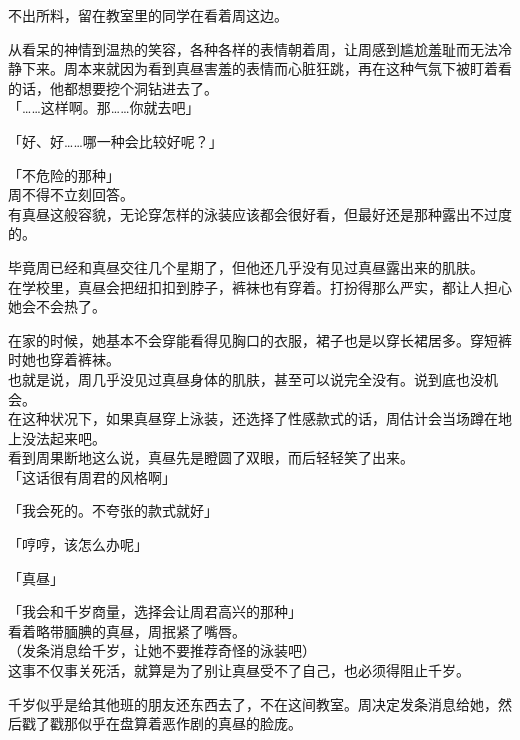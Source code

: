 不出所料，留在教室里的同学在看着周这边。

从看呆的神情到温热的笑容，各种各样的表情朝着周，让周感到尴尬羞耻而无法冷静下来。周本来就因为看到真昼害羞的表情而心脏狂跳，再在这种气氛下被盯着看的话，他都想要挖个洞钻进去了。\\

「……这样啊。那……你就去吧」

「好、好……哪一种会比较好呢？」

「不危险的那种」\\

周不得不立刻回答。\\

有真昼这般容貌，无论穿怎样的泳装应该都会很好看，但最好还是那种露出不过度的。

毕竟周已经和真昼交往几个星期了，但他还几乎没有见过真昼露出来的肌肤。\\

在学校里，真昼会把纽扣扣到脖子，裤袜也有穿着。打扮得那么严实，都让人担心她会不会热了。

在家的时候，她基本不会穿能看得见胸口的衣服，裙子也是以穿长裙居多。穿短裤时她也穿着裤袜。\\

也就是说，周几乎没见过真昼身体的肌肤，甚至可以说完全没有。说到底也没机会。\\

在这种状况下，如果真昼穿上泳装，还选择了性感款式的话，周估计会当场蹲在地上没法起来吧。\\

看到周果断地这么说，真昼先是瞪圆了双眼，而后轻轻笑了出来。\\

「这话很有周君的风格啊」

「我会死的。不夸张的款式就好」

「哼哼，该怎么办呢」

「真昼」

「我会和千岁商量，选择会让周君高兴的那种」\\

看着略带腼腆的真昼，周抿紧了嘴唇。\\

（发条消息给千岁，让她不要推荐奇怪的泳装吧）\\

这事不仅事关死活，就算是为了别让真昼受不了自己，也必须得阻止千岁。

千岁似乎是给其他班的朋友还东西去了，不在这间教室。周决定发条消息给她，然后戳了戳那似乎在盘算着恶作剧的真昼的脸庞。
